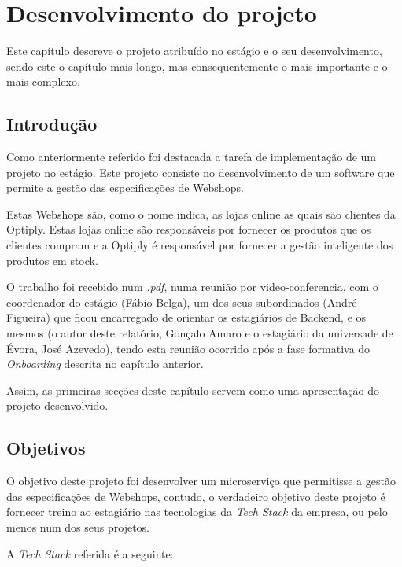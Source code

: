 \chapter{Desenvolvimento do projeto}\label{cap4}

Este capítulo descreve o projeto atribuído no estágio e o seu desenvolvimento, sendo este o capítulo mais longo, mas consequentemente o mais importante e o mais complexo.

\section{Introdução}

Como anteriormente referido foi destacada a tarefa de implementação de um projeto no estágio. Este projeto consiste no desenvolvimento de um software que permite a gestão das especificações de Webshops.

Estas Webshops são, como o nome indica, as lojas online as quais são clientes da Optiply. Estas lojas online são responsáveis por fornecer os produtos que os clientes compram e a Optiply é responsável por fornecer a gestão inteligente dos produtos em stock.

O trabalho foi recebido num \textit{.pdf}, numa reunião por video-conferencia, com o coordenador do estágio (Fábio Belga), um dos seus subordinados (André Figueira) que ficou encarregado de orientar os estagiários de Backend, e os mesmos (o autor deste relatório, Gonçalo Amaro e o estagiário da universade de Évora, José Azevedo), tendo esta reunião ocorrido após a fase formativa do \textit{Onboarding} descrita no capítulo anterior.

Assim, as primeiras secções deste capítulo servem como uma apresentação do projeto desenvolvido.

\section{Objetivos}

O objetivo deste projeto foi desenvolver um microserviço que permitisse a gestão das especificações de Webshops, contudo, o verdadeiro objetivo deste projeto é fornecer treino ao estagiário nas tecnologias da \textit{Tech Stack} da empresa, ou pelo menos num dos seus projetos.

\newpage

A \textit{Tech Stack} referida é a seguinte:

